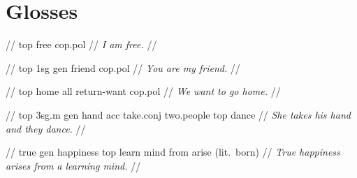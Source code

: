 \documentclass{article}
\begin{document}
\newpage\section{Glosses}

\ex
\begingl
\gla {}    //
 {\sc top} free {\sc cop.pol} //
\glft \textit{I am free.} //
\endgl
\xe

\ex
\begingl
\gla {}      //
 {\sc top} {\sc 1sg} {\sc gen} friend {\sc cop.pol} //
\glft \textit{You are my friend.} //
\endgl
\xe

\ex
\begingl
\gla {}      //
 {\sc top} home {\sc all} return-want {\sc cop.pol} //
\glft \textit{We want to go home.} //
\endgl
\xe

\ex
\begingl
\gla {}          //
 {\sc top} {\sc 3sg.m} {\sc gen} hand {\sc acc} take.{\sc conj} two.people {\sc top} dance //
\glft \textit{She takes his hand and they dance.} //
\endgl
\xe

\ex
\begingl
\gla {}        //
\glb true {\sc gen} happiness {\sc top} learn mind from {arise (lit.\ born)} //
\glft \textit{True happiness arises from a learning mind.} //
\endgl
\xe
\end{document}
